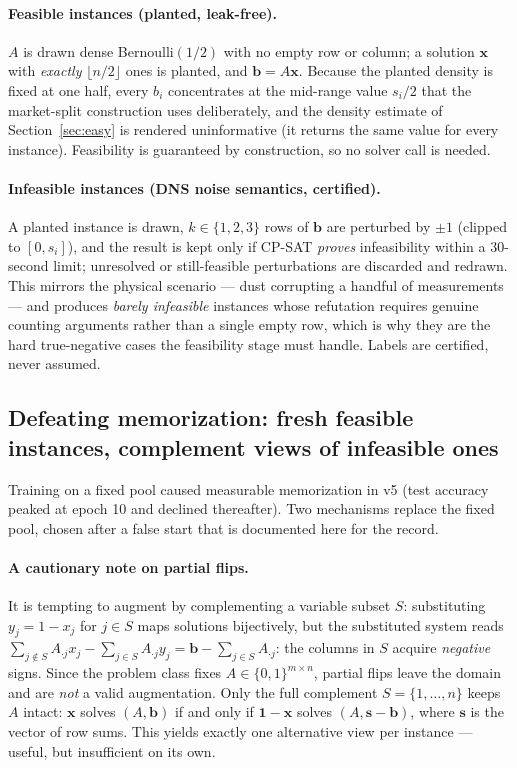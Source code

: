 \documentclass[12pt]{article}
\begin{document}
\paragraph{Feasible instances (planted, leak-free).} $A$ is drawn dense Bernoulli$(1/2)$ with no empty row or column; a solution $\mathbf{x}$ with \emph{exactly} $\lfloor n/2 \rfloor$ ones is planted, and $\mathbf{b} = A\mathbf{x}$. Because the planted density is fixed at one half, every $b_i$ concentrates at the mid-range value $s_i/2$ that the market-split construction uses deliberately, and the density estimate of Section~\ref{sec:easy} is rendered uninformative (it returns the same value for every instance). Feasibility is guaranteed by construction, so no solver call is needed.

\paragraph{Infeasible instances (DNS noise semantics, certified).} A planted instance is drawn, $k \in \{1,2,3\}$ rows of $\mathbf{b}$ are perturbed by $\pm 1$ (clipped to $[0, s_i]$), and the result is kept only if CP-SAT \emph{proves} infeasibility within a 30-second limit; unresolved or still-feasible perturbations are discarded and redrawn. This mirrors the physical scenario --- dust corrupting a handful of measurements --- and produces \emph{barely infeasible} instances whose refutation requires genuine counting arguments rather than a single empty row, which is why they are the hard true-negative cases the feasibility stage must handle. Labels are certified, never assumed.

\subsection{Defeating memorization: fresh feasible instances, complement views of infeasible ones}

Training on a fixed pool caused measurable memorization in v5 (test accuracy peaked at epoch 10 and declined thereafter). Two mechanisms replace the fixed pool, chosen after a false start that is documented here for the record.

\paragraph{A cautionary note on partial flips.} It is tempting to augment by complementing a variable subset $S$: substituting $y_j = 1 - x_j$ for $j \in S$ maps solutions bijectively, but the substituted system reads $\sum_{j \notin S} A_{\cdot j} x_j - \sum_{j \in S} A_{\cdot j} y_j = \mathbf{b} - \sum_{j \in S} A_{\cdot j}$: the columns in $S$ acquire \emph{negative} signs. Since the problem class fixes $A \in \{0,1\}^{m \times n}$, partial flips leave the domain and are \emph{not} a valid augmentation. Only the full complement $S = \{1,\dots,n\}$ keeps $A$ intact: $\mathbf{x}$ solves $(A, \mathbf{b})$ if and only if $\mathbf{1} - \mathbf{x}$ solves $(A, \mathbf{s} - \mathbf{b})$, where $\mathbf{s}$ is the vector of row sums. This yields exactly one alternative view per instance --- useful, but insufficient on its own.
\end{document}
